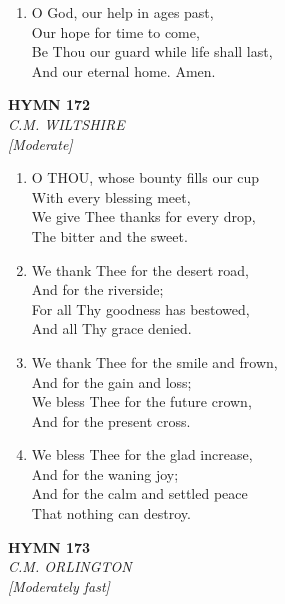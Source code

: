 \begin{enumerate}
    \item O God, our help in ages past, \\
        Our hope for time to come, \\
        Be Thou our guard while life shall last, \\
        And our eternal home. Amen.

\end{enumerate}

\newpage
\begin{center}
    {\Large \textbf{HYMN 172}}
    \\
    \textit{C.M. WILTSHIRE}
    \\
    \textit{\small [Moderate]}
\end{center}
\vspace{1em}

\begin{enumerate}
    \item O THOU, whose bounty fills our cup \\
        With every blessing meet, \\
        We give Thee thanks for every drop, \\
        The bitter and the sweet.

    \item We thank Thee for the desert road, \\
        And for the riverside; \\
        For all Thy goodness has bestowed, \\
        And all Thy grace denied.

    \item We thank Thee for the smile and frown, \\
        And for the gain and loss; \\
        We bless Thee for the future crown, \\
        And for the present cross.

    \item We bless Thee for the glad increase, \\
        And for the waning joy; \\
        And for the calm and settled peace \\
        That nothing can destroy.

\end{enumerate}

\newpage
\begin{center}
    {\Large \textbf{HYMN 173}}
    \\
    \textit{C.M. ORLINGTON}
    \\
    \textit{\small [Moderately fast]}
\end{center}
\vspace{1em}

